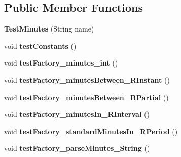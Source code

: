 \subsection*{Public Member Functions}
\begin{DoxyCompactItemize}
\item 
\hypertarget{classorg_1_1joda_1_1time_1_1_test_minutes_afa87eef1b7a6f3c60fb221a8e9843c65}{{\bfseries Test\-Minutes} (String name)}\label{classorg_1_1joda_1_1time_1_1_test_minutes_afa87eef1b7a6f3c60fb221a8e9843c65}

\item 
\hypertarget{classorg_1_1joda_1_1time_1_1_test_minutes_a783326acfe8ab66439edb37239f87ae3}{void {\bfseries test\-Constants} ()}\label{classorg_1_1joda_1_1time_1_1_test_minutes_a783326acfe8ab66439edb37239f87ae3}

\item 
\hypertarget{classorg_1_1joda_1_1time_1_1_test_minutes_a64e317389211dbf86c3a2c1c8f0edd27}{void {\bfseries test\-Factory\-\_\-minutes\-\_\-int} ()}\label{classorg_1_1joda_1_1time_1_1_test_minutes_a64e317389211dbf86c3a2c1c8f0edd27}

\item 
\hypertarget{classorg_1_1joda_1_1time_1_1_test_minutes_a5b03154ffc5f573d8988efd569faf3ec}{void {\bfseries test\-Factory\-\_\-minutes\-Between\-\_\-\-R\-Instant} ()}\label{classorg_1_1joda_1_1time_1_1_test_minutes_a5b03154ffc5f573d8988efd569faf3ec}

\item 
\hypertarget{classorg_1_1joda_1_1time_1_1_test_minutes_a7d458b10561070fda91663d85a6c487b}{void {\bfseries test\-Factory\-\_\-minutes\-Between\-\_\-\-R\-Partial} ()}\label{classorg_1_1joda_1_1time_1_1_test_minutes_a7d458b10561070fda91663d85a6c487b}

\item 
\hypertarget{classorg_1_1joda_1_1time_1_1_test_minutes_a12ac1400e2d03596679fb784b317047d}{void {\bfseries test\-Factory\-\_\-minutes\-In\-\_\-\-R\-Interval} ()}\label{classorg_1_1joda_1_1time_1_1_test_minutes_a12ac1400e2d03596679fb784b317047d}

\item 
\hypertarget{classorg_1_1joda_1_1time_1_1_test_minutes_a05dc8b07b815f10405d2f32d1e763d7f}{void {\bfseries test\-Factory\-\_\-standard\-Minutes\-In\-\_\-\-R\-Period} ()}\label{classorg_1_1joda_1_1time_1_1_test_minutes_a05dc8b07b815f10405d2f32d1e763d7f}

\item 
\hypertarget{classorg_1_1joda_1_1time_1_1_test_minutes_a50a650042f9c1df2dc31c3096e30a3db}{void {\bfseries test\-Factory\-\_\-parse\-Minutes\-\_\-\-String} ()}\label{classorg_1_1joda_1_1time_1_1_test_minutes_a50a650042f9c1df2dc31c3096e30a3db}


\end{DoxyCompactItemize}
